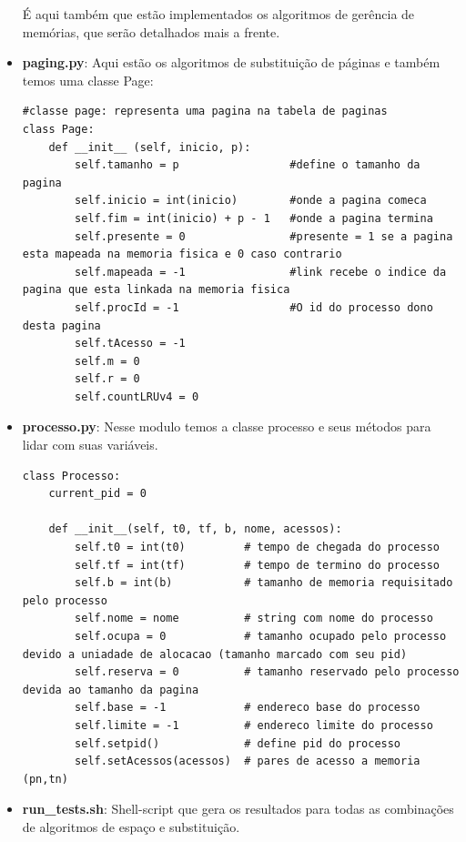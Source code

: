 \documentclass[12pt,a4paper]{article}
\begin{document}
\begin{itemize}
É aqui também que estão implementados os algoritmos de gerência de memórias, que serão detalhados mais a frente.

\item \textbf{paging.py}: Aqui estão os algoritmos de substituição de páginas e também temos uma classe Page:
\begin{lstlisting}
#classe page: representa uma pagina na tabela de paginas
class Page:
    def __init__ (self, inicio, p):
        self.tamanho = p                 #define o tamanho da pagina
        self.inicio = int(inicio)        #onde a pagina comeca
        self.fim = int(inicio) + p - 1   #onde a pagina termina
        self.presente = 0                #presente = 1 se a pagina esta mapeada na memoria fisica e 0 caso contrario
        self.mapeada = -1                #link recebe o indice da pagina que esta linkada na memoria fisica
        self.procId = -1                 #O id do processo dono desta pagina
        self.tAcesso = -1
        self.m = 0
        self.r = 0
        self.countLRUv4 = 0  
\end{lstlisting}

\item \textbf{processo.py}: Nesse modulo temos a classe processo e seus métodos para lidar com suas variáveis. 
\begin{lstlisting}
class Processo:
    current_pid = 0

    def __init__(self, t0, tf, b, nome, acessos):
        self.t0 = int(t0)         # tempo de chegada do processo
        self.tf = int(tf)         # tempo de termino do processo
        self.b = int(b)           # tamanho de memoria requisitado pelo processo
        self.nome = nome          # string com nome do processo
        self.ocupa = 0            # tamanho ocupado pelo processo devido a uniadade de alocacao (tamanho marcado com seu pid)
        self.reserva = 0          # tamanho reservado pelo processo devida ao tamanho da pagina  
        self.base = -1            # endereco base do processo
        self.limite = -1          # endereco limite do processo  
        self.setpid()             # define pid do processo
        self.setAcessos(acessos)  # pares de acesso a memoria (pn,tn)

\end{lstlisting}

\item \textbf{run\_tests.sh}: Shell-script que gera os resultados para todas as combinações de algoritmos de espaço e substituição.
\end{itemize}
\end{document}
